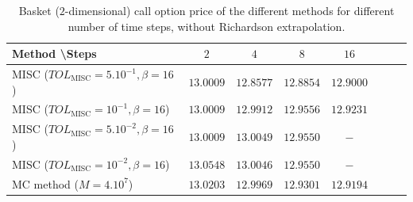 \begin{table}[h!]
\centering
\begin{tabular}{l*{6}{c}r}
Method \textbackslash  Steps            & $2$ & $4$ & $8$ & $16$ &   \\
\hline
MISC ($TOL_{\text{MISC}}=5.10^{-1},\beta=16$)  & $
 13.0009$ & $    12.8577$ & $    12.8854$ & $
   12.9000$  \\
MISC ($TOL_{\text{MISC}}=10^{-1},\beta=16$)  & $
 13.0009$ & $   12.9912
$ & $
12.9556
$ &$ 12.9231$  \\
MISC ($TOL_{\text{MISC}}=5.10^{-2},\beta=16$) & $
 13.0009$ & $    13.0049
$ & $ 12.9550

$ & $-$  \\
MISC ($TOL_{\text{MISC}}=10^{-2},\beta=16$) & $  13.0548$ & $    13.0046$ & $   12.9550
$ &$-$  \\
\hline
MC method ($M=4.10^{7}$)   & $  13.0203
$ & $ 12.9969$ & $12.9301
$ & $ 12.9194 $  \\
\hline
\end{tabular}
\caption{Basket ($2$-dimensional) call option price of the different methods for different number of time steps, without Richardson extrapolation.}
\label{table:Basket 2d option price of the different methods for different number of time steps, without Richardson extrapolation, beta_16}
\end{table}







\FloatBarrier



